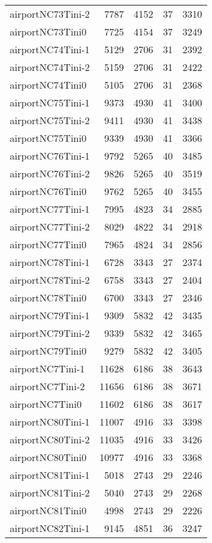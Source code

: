 \begin{longtable}{lrrrr}
airportNC73Tini-2 & 7787 & 4152 & 37 & 3310 \\
airportNC73Tini0 & 7725 & 4154 & 37 & 3249 \\
airportNC74Tini-1 & 5129 & 2706 & 31 & 2392 \\
airportNC74Tini-2 & 5159 & 2706 & 31 & 2422 \\
airportNC74Tini0 & 5105 & 2706 & 31 & 2368 \\
airportNC75Tini-1 & 9373 & 4930 & 41 & 3400 \\
airportNC75Tini-2 & 9411 & 4930 & 41 & 3438 \\
airportNC75Tini0 & 9339 & 4930 & 41 & 3366 \\
airportNC76Tini-1 & 9792 & 5265 & 40 & 3485 \\
airportNC76Tini-2 & 9826 & 5265 & 40 & 3519 \\
airportNC76Tini0 & 9762 & 5265 & 40 & 3455 \\
airportNC77Tini-1 & 7995 & 4823 & 34 & 2885 \\
airportNC77Tini-2 & 8029 & 4822 & 34 & 2918 \\
airportNC77Tini0 & 7965 & 4824 & 34 & 2856 \\
airportNC78Tini-1 & 6728 & 3343 & 27 & 2374 \\
airportNC78Tini-2 & 6758 & 3343 & 27 & 2404 \\
airportNC78Tini0 & 6700 & 3343 & 27 & 2346 \\
airportNC79Tini-1 & 9309 & 5832 & 42 & 3435 \\
airportNC79Tini-2 & 9339 & 5832 & 42 & 3465 \\
airportNC79Tini0 & 9279 & 5832 & 42 & 3405 \\
airportNC7Tini-1 & 11628 & 6186 & 38 & 3643 \\
airportNC7Tini-2 & 11656 & 6186 & 38 & 3671 \\
airportNC7Tini0 & 11602 & 6186 & 38 & 3617 \\
airportNC80Tini-1 & 11007 & 4916 & 33 & 3398 \\
airportNC80Tini-2 & 11035 & 4916 & 33 & 3426 \\
airportNC80Tini0 & 10977 & 4916 & 33 & 3368 \\
airportNC81Tini-1 & 5018 & 2743 & 29 & 2246 \\
airportNC81Tini-2 & 5040 & 2743 & 29 & 2268 \\
airportNC81Tini0 & 4998 & 2743 & 29 & 2226 \\
airportNC82Tini-1 & 9145 & 4851 & 36 & 3247 \\

\end{longtable}
